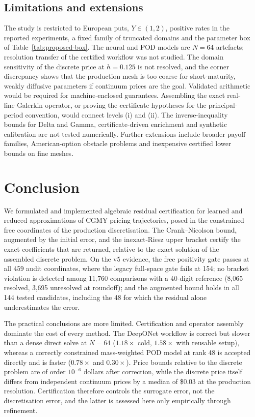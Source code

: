 \documentclass[11pt]{amsart}
\theoremstyle{remark}
\begin{document}
\subsection{Limitations and extensions}
The study is restricted to European puts, $Y\in(1,2)$, positive rates in
the reported experiments, a fixed family of truncated domains and the
parameter box of Table~\ref{tab:proposed-box}. The neural and POD models
are $N=64$ artefacts; resolution transfer of the certified workflow was not
studied. The domain sensitivity of the discrete price at $h=0.125$ is not
resolved, and the corner discrepancy shows that the production mesh is too
coarse for short-maturity, weakly diffusive parameters if continuum prices
are the goal. Validated arithmetic would be required for machine-enclosed
guarantees. Assembling the exact real-line Galerkin operator, or proving
the certificate hypotheses for the principal-period convention, would
connect levels (i) and (ii). The inverse-inequality bounds for Delta and
Gamma, certificate-driven enrichment and synthetic calibration are not
tested numerically. Further extensions include broader payoff families,
American-option obstacle problems and inexpensive certified lower bounds on
fine meshes.

\section{Conclusion}
\label{sec:conclusion}

We formulated and implemented algebraic residual certification for learned
and reduced approximations of CGMY pricing trajectories, posed in the
constrained free coordinates of the production discretisation. The
Crank--Nicolson bound, augmented by the initial error, and the inexact-Riesz
upper bracket certify the exact coefficients that are returned, relative to
the exact solution of the assembled discrete problem. On the v5 evidence,
the free positivity gate passes at all 459 audit coordinates, where the
legacy full-space gate fails at 154; no bracket violation is detected
among 11{,}760 comparisons with a 40-digit reference (8{,}065 resolved,
3{,}695 unresolved at roundoff); and the augmented bound holds in all 144
tested candidates, including the 48 for which the residual alone
underestimates the error.

The practical conclusions are more limited. Certification and operator
assembly dominate the cost of every method. The DeepONet workflow is
correct but slower than a dense direct solve at $N=64$ ($1.18\times$ cold,
$1.58\times$ with reusable setup), whereas a correctly constrained
mass-weighted POD model at rank 48 is accepted directly and is faster
($0.78\times$ and $0.30\times$). Price bounds relative to the
discrete problem are of order $10^{-6}$ dollars after correction, while the
discrete price itself differs from independent continuum prices by a median
of \$0.03 at the production resolution. Certification therefore controls
the surrogate error, not the discretisation error, and the latter is
assessed here only empirically through refinement.
\end{document}
